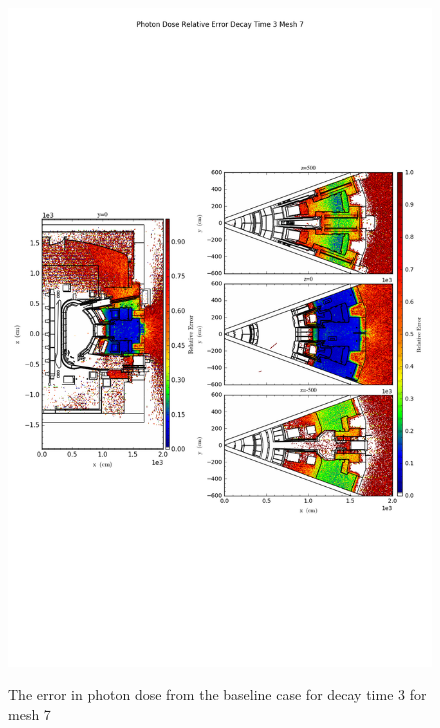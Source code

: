 \begin{figure}[ht!]
\centering
\includegraphics[trim={0cm 9cm 0cm 10cm},clip,scale=0.75]{../plots/final_model_nob4c/Photon_Dose_Relative_Error_Decay_Time_3_Mesh_7.png}
\label{fig:photons_dc3_no4bc_m7_error}
\caption{The error in photon dose from the baseline case for decay time 3 for mesh 7}
\end{figure}
